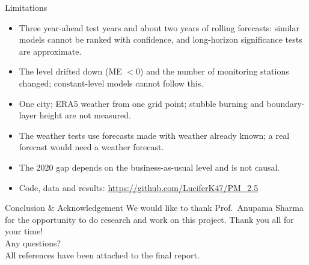\documentclass[aspectratio=169,11pt]{beamer}
\begin{document}
\begin{frame}{Limitations}
  \begin{itemize}
    \item Three year-ahead test years and about two years of rolling forecasts: similar models cannot be ranked with confidence, and long-horizon significance tests are approximate.
    \item The level drifted down (ME $<0$) and the number of monitoring stations changed; constant-level models cannot follow this.
    \item One city; ERA5 weather from one grid point; stubble burning and boundary-layer height are not measured.
    \item The weather tests use forecasts made with weather already known; a real forecast would need a weather forecast.
    \item The 2020 gap depends on the business-as-usual level and is not causal.
    \item Code, data and results: \url{https://github.com/LuciferK47/PM_2.5}
  \end{itemize}
\end{frame}

\begin{frame}{Conclusion \& Acknowledgement}
  \vspace{0.8cm}
  We would like to thank Prof.\ Anupama Sharma for the opportunity to do research and work on this project. Thank you all for your time!\\[6pt]
  Any questions?\\[6pt]
  All references have been attached to the final report.
\end{frame}
\end{document}
